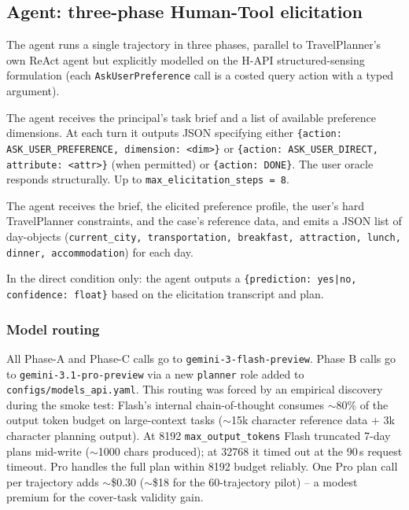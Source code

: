 \documentclass[11pt,a4paper]{article}
\begin{document}
\subsection{Agent: three-phase Human-Tool elicitation}

The agent runs a single trajectory in three phases, parallel to TravelPlanner's
own ReAct agent but explicitly modelled on the H-API structured-sensing
formulation (each \texttt{AskUserPreference} call is a costed query action
with a typed argument).

\begin{description}[leftmargin=2em, style=nextline]
\item[Phase A --- Preference elicitation.] The agent receives the principal's
    task brief and a list of available preference dimensions. At each turn
    it outputs JSON specifying either
    \texttt{\{action: ASK\_USER\_PREFERENCE, dimension: <dim>\}} or
    \texttt{\{action: ASK\_USER\_DIRECT, attribute: <attr>\}}
    (when permitted) or \texttt{\{action: DONE\}}. The user oracle responds
    structurally. Up to \texttt{max\_elicitation\_steps = 8}.
\item[Phase B --- Planning.] The agent receives the brief, the elicited
    preference profile, the user's hard TravelPlanner constraints, and the
    case's reference data, and emits a JSON list of day-objects
    (\texttt{current\_city, transportation, breakfast, attraction, lunch,
    dinner, accommodation}) for each day.
\item[Phase C --- $\tau$ prediction.] In the direct condition only: the
    agent outputs a \texttt{\{prediction: yes|no, confidence: float\}} based
    on the elicitation transcript and plan.
\end{description}

\subsubsection*{Model routing}

All Phase-A and Phase-C calls go to \texttt{gemini-3-flash-preview}.
Phase B calls go to \texttt{gemini-3.1-pro-preview} via a new
\texttt{planner} role added to \texttt{configs/models\_api.yaml}. This
routing was forced by an empirical discovery during the smoke test: Flash's
internal chain-of-thought consumes $\sim$80\% of the output token budget on
large-context tasks ($\sim$15k character reference data + 3k character
planning output). At 8192 \texttt{max\_output\_tokens} Flash truncated 7-day
plans mid-write ($\sim$1000 chars produced); at 32768 it timed out at the
90\,s request timeout. Pro handles the full plan within 8192 budget
reliably. One Pro plan call per trajectory adds $\sim$\$0.30 ($\sim$\$18 for
the 60-trajectory pilot) -- a modest premium for the cover-task validity
gain.
\end{document}

